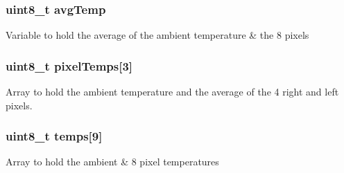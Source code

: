 \subsubsection[{avg\+Temp}]{\setlength{\rightskip}{0pt plus 5cm}uint8\+\_\+t avg\+Temp}\label{thermal_sensor_8h_ae2fc39671c0173304986f05dba26bbbf}
Variable to hold the average of the ambient temperature \& the 8 pixels 
\subsubsection[{pixel\+Temps}]{\setlength{\rightskip}{0pt plus 5cm}uint8\+\_\+t pixel\+Temps[3]}\label{thermal_sensor_8h_a4e3d917ec36695a5c4b2aeb41f4d6875}
Array to hold the ambient temperature and the average of the 4 right and left pixels. 
\subsubsection[{temps}]{\setlength{\rightskip}{0pt plus 5cm}uint8\+\_\+t temps[9]}\label{thermal_sensor_8h_a303bfbfba8466a335e14331344e03ed7}
Array to hold the ambient \& 8 pixel temperatures 